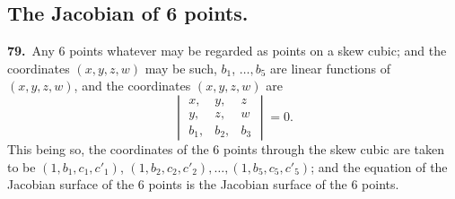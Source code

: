 \documentclass[11pt,a4paper]{article}
\begin{document}
\newpage
\setcounter{page}{163}

\subsection*{The Jacobian of 6 points.}

\noindent\textbf{79.}\ Any 6 points whatever may be regarded as points on a skew cubic; and the coordinates $(x, y, z, w)$ may be such, $b_1$, $\ldots, b_5$ are linear functions of $(x, y, z, w)$, and the coordinates $(x, y, z, w)$ are
\[
\begin{vmatrix}
x, & y, & z\\
y, & z, & w\\
b_1, & b_2, & b_3
\end{vmatrix} = 0.
\]
This being so, the coordinates of the 6 points through the skew cubic are taken to be $(1, b_1, c_1, c'_1)$, $(1, b_2, c_2, c'_2), \ldots, (1, b_5, c_5, c'_5)$; and the equation of the Jacobian surface of the 6 points is the Jacobian surface of the 6 points.

\medskip
\end{document}
